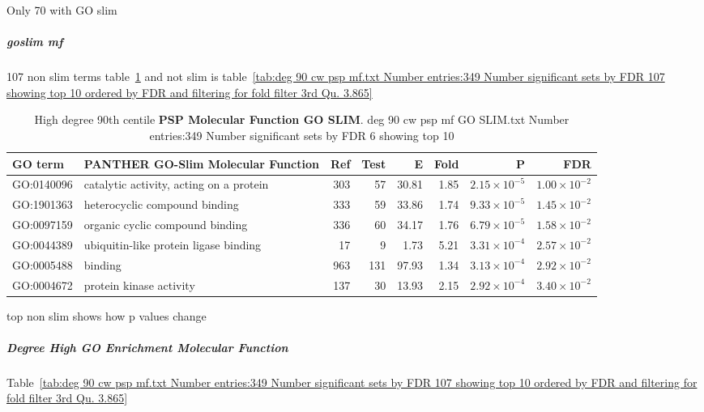 Only 70 with GO slim



\subparagraph{goslim mf}
107 non slim terms table~\ref{tab:deg 90 cw psp mf GO SLIM.txt Number entries:349 Number significant sets by FDR 6 showing top 10} and  not slim is table~\ref{tab:deg 90 cw psp mf.txt Number entries:349 Number significant sets by FDR 107 showing top 10 ordered by FDR and filtering for fold filter 3rd Qu. 3.865}
\begin{table}[ht]
 \centering
 \begin{adjustbox}{width=\textwidth}
\begin{tabular}{llrrrrrr}
  \hline
GO term & PANTHER GO-Slim Molecular Function & Ref & Test & E & Fold & P & FDR \\ 
  \hline
GO:0140096 & catalytic activity, acting on a protein  & 303 & 57 & 30.81 & 1.85 & $2.15 \times 10^{-5}$ & $1.00 \times 10^{-2}$ \\ 
  GO:1901363 & heterocyclic compound binding  & 333 & 59 & 33.86 & 1.74 & $9.33 \times 10^{-5}$ & $1.45 \times 10^{-2}$ \\ 
  GO:0097159 & organic cyclic compound binding  & 336 & 60 & 34.17 & 1.76 & $6.79 \times 10^{-5}$ & $1.58 \times 10^{-2}$ \\ 
  GO:0044389 & ubiquitin-like protein ligase binding  & 17 & 9 & 1.73 & 5.21 & $3.31 \times 10^{-4}$ & $2.57 \times 10^{-2}$ \\ 
  GO:0005488 & binding  & 963 & 131 & 97.93 & 1.34 & $3.13 \times 10^{-4}$ & $2.92 \times 10^{-2}$ \\ 
  GO:0004672 & protein kinase activity  & 137 & 30 & 13.93 & 2.15 & $2.92 \times 10^{-4}$ & $3.40 \times 10^{-2}$ \\ 
  \hline
\end{tabular}
    \end{adjustbox}
\caption{High degree 90th centile \textbf{PSP Molecular Function GO SLIM}. deg 90 cw psp mf GO SLIM.txt Number entries:349 Number significant sets by FDR 6 showing top 10} 
\label{tab:deg 90 cw psp mf GO SLIM.txt Number entries:349 Number significant sets by FDR 6 showing top 10}
\end{table}

top non slim shows how p values change
\subparagraph{Degree High GO Enrichment Molecular Function}

Table~\ref{tab:deg 90 cw psp mf.txt Number entries:349 Number significant sets by FDR 107 showing top 10 ordered by FDR and filtering for fold filter 3rd Qu. 3.865}



